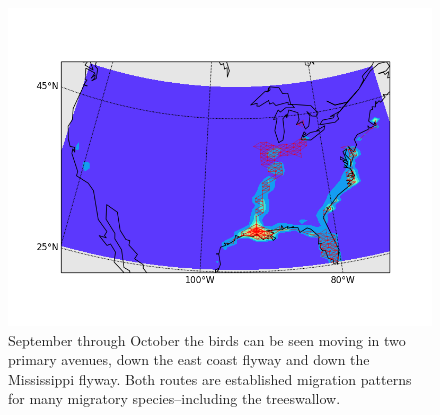 \begin{figure}[ht]
\centering
\includegraphics[width=.9\textwidth]{../code/swallowpics/bird38.png}
\caption{September through October the birds can be seen moving in two primary avenues, down the east coast flyway and down the Mississippi flyway.  Both routes are established migration patterns for many migratory species--including the treeswallow.}
\label{figBidLouisiana}
\end{figure}